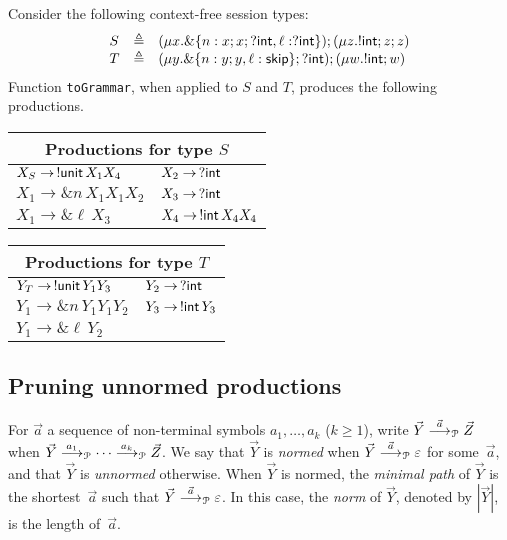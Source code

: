 \begin{example}
\label{ex:productions}
Consider the following context-free session types:
%
\begin{equation*}
\begin{array}{lll}
    S & \triangleq & (\mu x . \&\{n: x;x;?\intk, \ell: ?\intk\});(\mu z . !\intk ; z;z)\\
    T & \triangleq & (\mu y . \&\{n: y;y, \ell: \skipk\};?\intk);(\mu w. !\intk ; w)
\end{array}
\end{equation*}
%
Function \lstinline{toGrammar}, when applied to $S$ and $T$, produces
the following productions.
\begin{center}
  \begin{tabular}{l l}
    \multicolumn{2}{c}{Productions for type $S$}\\ \hline
    $X_S \rightarrow \,\initialProd\, X_1 X_4$ &$X_2 \rightarrow \,? \intk$\\
    $X_1 \rightarrow \& n\, X_1 X_1 X_2$&$X_3 \rightarrow \,? \intk$\\
    $X_1 \rightarrow \& \ell\, X_3$ &$X_4 \rightarrow \,!\intk\, X_4 X_4$\\
  \end{tabular} \qquad
  \begin{tabular}{l l}
    \multicolumn{2}{c}{Productions for type $T$}\\ \hline
    $Y_T \rightarrow \,\initialProd\, Y_1 Y_3 $&$Y_2 \rightarrow \,? \intk$\\
    $Y_1 \rightarrow \& n\, Y_1 Y_1 Y_2 $&$Y_3 \rightarrow \,!\intk\, Y_3$\\
    $Y_1 \rightarrow \& \ell \,Y_2 $ &
  \end{tabular}
\end{center}
\end{example}

\subsection{Pruning unnormed productions}
\label{subsec:prune}

For $\vec a$ a sequence of non-terminal symbols $a_1,\ldots, a_k$
($k\ge1$), write $\vec Y \LTSderivesP[\vec a] \vec Z$ when
$\vec Y \LTSderivesP[a_1] \cdots \LTSderivesP[a_k] \vec Z$.
%
We say that $\vec Y$ is \emph{normed} when
$\vec Y \LTSderivesP[\vec a] \varepsilon$ for some~$\vec a$, and that
$\vec Y$ is \emph{unnormed} otherwise.
%
When $\vec Y$ is normed, the \emph{minimal path} of $\vec Y$ is the
shortest~$\vec a$ such that $\vec Y \LTSderivesP[\vec a]
\varepsilon$.
%
In this case, the \emph{norm} of $\vec Y$, denoted by $|\vec Y|$, is
the length of~$\vec a$.

